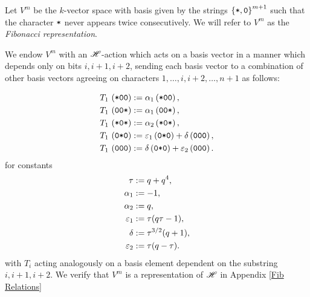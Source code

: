\documentclass{amsart}
\begin{document}
  \begin{definition}\label{Fib definition}
  Let $V^m$ be the $k$-vector space with basis given by the strings $\left\{ \texttt{*},\texttt{0} \right\}^{m+1}$ such that the character $\texttt{*}$ never appears twice consecutively. 
  We will refer to $V^m$ as the \emph{Fibonacci representation}.

  We endow $V^m$ with an $\mathscr{H}$-action which acts on a basis vector in a manner which depends only on bits $i,i+1,i+2$, sending each basis vector to a combination of other basis vectors agreeing on characters $1,\dots,i,i+2,\dots,n+1$ as follows:

  \begin{equation} 
    \begin{split}
      T_1 \, \left( \texttt{*}\texttt{0}\texttt{0} \right) &:= \alpha_1\left( \texttt{*}\texttt{0}\texttt{0} \right),\\
      T_1 \, \left( \texttt{0}\texttt{0}\texttt{*} \right) &:= \alpha_1\left( \texttt{0}\texttt{0}\texttt{*} \right),\\
      T_1 \, \left( \texttt{*}\texttt{0}\texttt{*} \right) &:= \alpha_2\left( \texttt{*}\texttt{0}\texttt{*} \right),\\
      T_1 \, \left( \texttt{0}\texttt{*}\texttt{0} \right) &:= \varepsilon_1\left( \texttt{0}\texttt{*}\texttt{0} \right) + \delta\left( \texttt{0}\texttt{0}\texttt{0} \right),\\
      T_1 \, \left( \texttt{0}\texttt{0}\texttt{0} \right) &:= \delta\left( \texttt{0}\texttt{*}\texttt{0} \right) + \varepsilon_2\left( \texttt{0}\texttt{0}\texttt{0} \right).
  \end{split} \label{Fib Action} 
  \end{equation}
  for constants
  \begin{equation}
    \begin{split}
    \tau  &:= q + q^4,\\
    \alpha_1 &:= -1,\\
    \alpha_2 &:= q,\\
    \varepsilon_1 &:= \tau(q\tau - 1),\\
    \delta &:= \tau^{3/2}(q + 1),\\
    \varepsilon_2 &:= \tau(q-\tau).
  \end{split} \label{Fib Constants} 
  \end{equation}
  with $T_i$ acting analogously on a basis element dependent on the substring $i,i+1,i+2$.
  We verify that $V^m$ is a representation of $\mathscr{H}$ in Appendix \ref{Fib Relations}
  \end{definition}
\end{document}
